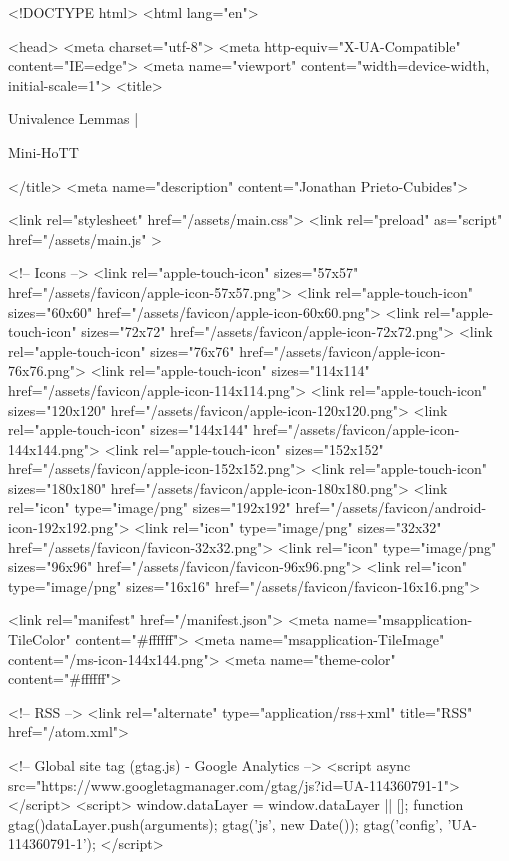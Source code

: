 <!DOCTYPE html>
<html lang="en">

<head>
  <meta charset="utf-8">
  <meta http-equiv="X-UA-Compatible" content="IE=edge">
  <meta name="viewport" content="width=device-width, initial-scale=1">
  <title>
    
      
        Univalence Lemmas |
      
        Mini-HoTT
    
  </title>
  <meta name="description" content="Jonathan Prieto-Cubides">

  <link rel="stylesheet" href="/assets/main.css">
  <link rel="preload" as="script" href="/assets/main.js" >

  <!-- Icons -->
  <link rel="apple-touch-icon" sizes="57x57" href="/assets/favicon/apple-icon-57x57.png">
  <link rel="apple-touch-icon" sizes="60x60" href="/assets/favicon/apple-icon-60x60.png">
  <link rel="apple-touch-icon" sizes="72x72" href="/assets/favicon/apple-icon-72x72.png">
  <link rel="apple-touch-icon" sizes="76x76" href="/assets/favicon/apple-icon-76x76.png">
  <link rel="apple-touch-icon" sizes="114x114" href="/assets/favicon/apple-icon-114x114.png">
  <link rel="apple-touch-icon" sizes="120x120" href="/assets/favicon/apple-icon-120x120.png">
  <link rel="apple-touch-icon" sizes="144x144" href="/assets/favicon/apple-icon-144x144.png">
  <link rel="apple-touch-icon" sizes="152x152" href="/assets/favicon/apple-icon-152x152.png">
  <link rel="apple-touch-icon" sizes="180x180" href="/assets/favicon/apple-icon-180x180.png">
  <link rel="icon" type="image/png" sizes="192x192"  href="/assets/favicon/android-icon-192x192.png">
  <link rel="icon" type="image/png" sizes="32x32" href="/assets/favicon/favicon-32x32.png">
  <link rel="icon" type="image/png" sizes="96x96" href="/assets/favicon/favicon-96x96.png">
  <link rel="icon" type="image/png" sizes="16x16" href="/assets/favicon/favicon-16x16.png">

  <link rel="manifest" href="/manifest.json">
  <meta name="msapplication-TileColor" content="#ffffff">
  <meta name="msapplication-TileImage" content="/ms-icon-144x144.png">
  <meta name="theme-color" content="#ffffff">

  <!-- RSS -->
  <link rel="alternate" type="application/rss+xml" title="RSS" href="/atom.xml">

  <!-- Global site tag (gtag.js) - Google Analytics -->
  <script async src="https://www.googletagmanager.com/gtag/js?id=UA-114360791-1"></script>
  <script>
    window.dataLayer = window.dataLayer || [];
    function gtag(){dataLayer.push(arguments);}
    gtag('js', new Date());
    gtag('config', 'UA-114360791-1');
  </script>

